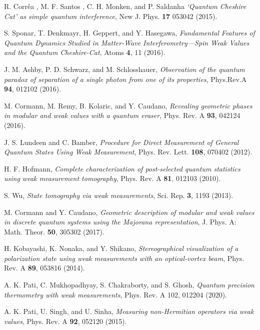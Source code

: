\documentclass[aps,pra,showpacs,twoside,twocolumn,10pt]{revtex4-1}
\begin{document}
\begin{thebibliography}{100}
 R. Corr\^{e}a , M. F. Santos , C. H. Monken, and P. Saldanha \textit{`Quantum Cheshire Cat' as simple quantum interference}, New J. Phys. \textbf{17} 053042 (2015).

 S. Sponar, T. Denkmayr, H. Geppert, and Y. Hasegawa, \textit{Fundamental Features of Quantum Dynamics Studied in Matter-Wave Interferometry—Spin Weak Values and the Quantum Cheshire-Cat}, Atoms \textbf{4}, 11 (2016).

 J. M. Ashby, P. D. Schwarz, and M. Schlosshauer, \textit{Observation of the quantum paradox of separation of a single photon from one of its properties}, Phys.Rev.A \textbf{94}, 012102 (2016).

 M. Cormann, M. Remy, B. Kolaric, and Y. Caudano, \textit{Revealing geometric phases in modular and weak values with a quantum eraser}, Phys. Rev. A \textbf{93}, 042124 (2016).

 J. S. Lundeen and C. Bamber, \textit{Procedure for Direct Measurement of General Quantum States Using Weak Measurement}, Phys. Rev. Lett. \textbf{108}, 070402 (2012).


 H. F. Hofmann, \textit{Complete characterization of post-selected quantum statistics using weak measurement tomography}, Phys. Rev. A \textbf{81}, 012103 (2010).

 S. Wu, \textit{State tomography via weak measurements}, Sci. Rep. \textbf{3}, 1193 (2013).







 M. Cormann and Y. Caudano, \textit{Geometric description of modular and weak values in discrete quantum systems using the Majorana representation}, J. Phys. A: Math. Theor. \textbf{50}, 305302 (2017).

 H. Kobayashi, K. Nonaka, and Y. Shikano, \textit{Stereographical visualization of a polarization state using weak measurements with an optical-vortex beam}, Phys. Rev. A \textbf{89}, 053816 (2014).

 A. K. Pati, C. Mukhopadhyay, S. Chakraborty, and S. Ghosh, \textit{Quantum precision thermometry with weak measurements}, Phys. Rev. A 102, 012204 (2020).

 A. K. Pati, U. Singh, and U. Sinha, \textit{Measuring non-Hermitian operators via weak values}, Phys. Rev. A \textbf{92}, 052120 (2015).


\end{thebibliography}
\end{document}

